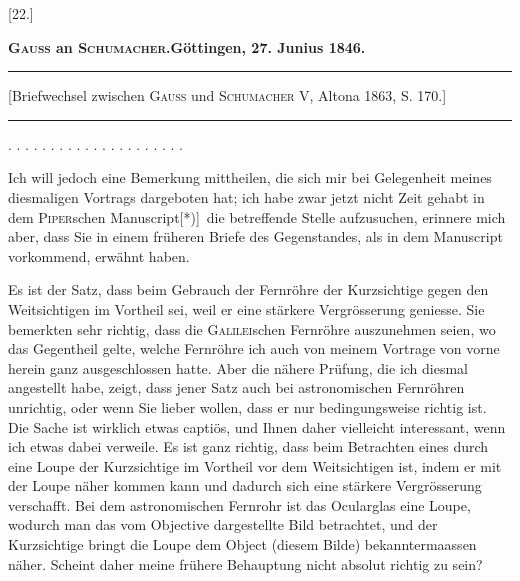\clearpage\begingroup
{}

\begin{center}
[22.]\par\medskip
\textbf{\textsc{Gauss} an \textsc{Schumacher}.\quad Göttingen, 27. Junius 1846.}\par\medskip
\rule{.82\linewidth}{.4pt}\par\smallskip
{\footnotesize [Briefwechsel zwischen \textsc{Gauss} und \textsc{Schumacher} V, Altona 1863, S. 170.]}\par\smallskip
\rule{.82\linewidth}{.4pt}
\end{center}
\noindent . . . . . . . . . . . . . . . . . . . . .\par
\noindent\hspace*{\parindent}Ich will jedoch eine Bemerkung mittheilen, die sich mir bei Gelegenheit meines diesmaligen Vortrags dargeboten hat; ich habe zwar jetzt nicht Zeit gehabt in dem \textsc{Piper}schen Manuscript[*)]\begingroup\renewcommand{\thefootnote}{}\endgroup\ die betreffende Stelle aufzusuchen, erinnere mich aber, dass Sie in einem früheren Briefe des Gegenstandes, als in dem Manuscript vorkommend, erwähnt haben.

Es ist der Satz, dass beim Gebrauch der Fernröhre der Kurzsichtige gegen den Weitsichtigen im Vortheil sei, weil er eine stärkere Vergrösserung geniesse. Sie bemerkten sehr richtig, dass die \textsc{Galilei}schen Fernröhre auszunehmen seien, wo das Gegentheil gelte, welche Fernröhre ich auch von meinem Vortrage von vorne herein ganz ausgeschlossen hatte. Aber die nähere Prüfung, die ich diesmal angestellt habe, zeigt, dass jener Satz auch bei astronomischen Fernröhren unrichtig, oder wenn Sie lieber wollen, dass er nur bedingungsweise richtig ist. Die Sache ist wirklich etwas captiös, und Ihnen daher vielleicht interessant, wenn ich etwas dabei verweile. Es ist ganz richtig, dass beim Betrachten eines  durch eine Loupe der Kurzsichtige im Vortheil vor dem Weitsichtigen ist, indem er mit der Loupe näher kommen kann und dadurch sich eine stärkere Vergrösserung verschafft. Bei dem astronomischen Fernrohr ist das Ocularglas eine Loupe, wodurch man das vom Objective dargestellte Bild betrachtet, und der Kurzsichtige bringt die Loupe dem Object (diesem Bilde) bekanntermaassen näher. Scheint daher meine frühere Behauptung nicht absolut richtig zu sein?

